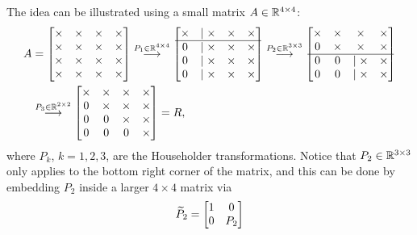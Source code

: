 The idea can be illustrated using a small matrix $A\in\mathbb{R}^{4\times 4}$:
\begin{equation}\notag
    \begin{aligned}
    A &=
    \begin{bmatrix}
        \times & \times & \times & \times\\
        \times & \times & \times & \times\\
        \times & \times & \times & \times\\
        \times & \times & \times & \times
    \end{bmatrix}
    \stackrel{P_1 \in\mathbb{R}^{4\times 4}}{\longrightarrow}
    \begin{bmatrix}
        \times &\mid \times & \times & \times\\\hline
        0 &\mid \times & \times & \times\\
        0 & \mid\times & \times & \times\\
        0 & \mid\times & \times & \times\\
    \end{bmatrix}
    \stackrel{P_2 \in\mathbb{R}^{3\times 3}}{\longrightarrow}
    \begin{bmatrix}
        \times & \times & \times & \times\\
        0 & \times & \times & \times\\ \hline
        0 & 0 &\mid \times & \times\\
        0 & 0 & \mid \times & \times\\
    \end{bmatrix}\\
    & \stackrel{P_3 \in\mathbb{R}^{2\times 2}}{\longrightarrow}
    \begin{bmatrix}
        \times & \times & \times & \times\\
        0 & \times & \times & \times\\
        0 & 0 &\times & \times\\
        0 & 0 & 0 & \times\\
    \end{bmatrix} = R,
    \end{aligned}
\end{equation}
where $P_k$, $k = 1,2,3$, are the Householder transformations. Notice that $P_2\in\mathbb{R}^{3\times 3}$ only applies to the bottom right corner of the matrix, and this can be done by embedding $P_2$ inside a larger $4\times 4$ matrix via
\begin{equation}\notag
    \widetilde P_2 =
    \begin{bmatrix}
        1 & 0 \\
        0 & P_2
    \end{bmatrix}
\end{equation}


